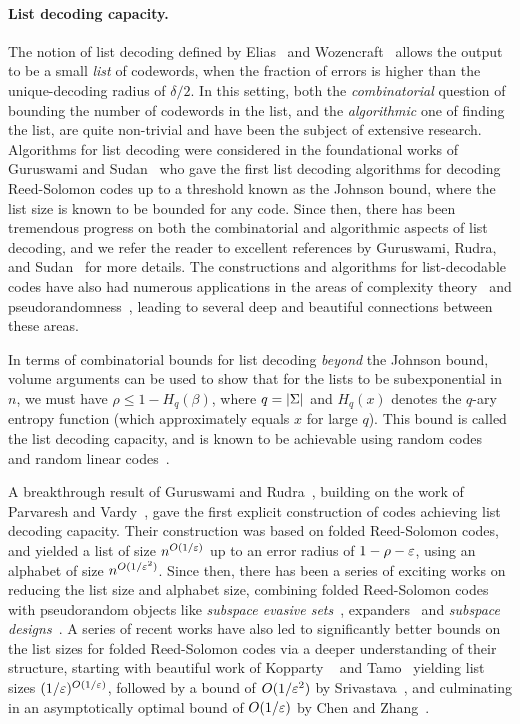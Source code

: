 \vspace{-5 pt}
\paragraph{List decoding capacity.}
%
The notion of list decoding defined by Elias~\cite{E57} and Wozencraft~\cite{W58} allows the output to be a small \emph{list} of codewords, when the fraction of errors is higher than the unique-decoding radius of $\delta/2$.
%
In this setting, both the \emph{combinatorial} question of bounding the number of codewords in the list, and the \emph{algorithmic} one of finding the list, are quite non-trivial and have been the subject of extensive research. Algorithms for list decoding were considered in the foundational works of Guruswami and Sudan~\cite{Sudan97, GS98} who gave the first list decoding algorithms for decoding Reed-Solomon codes up to a threshold known as the Johnson bound, where the list size is known to be bounded for any code.
%
Since then, there has been tremendous progress on both the combinatorial and algorithmic aspects of list decoding, and we refer the reader to excellent references by Guruswami, Rudra, and Sudan~\cite{Guruswami06, GRS23} for more details.
%
The constructions and algorithms for list-decodable codes have also had numerous applications in the areas of complexity theory~\cite{Sudan00, Trevisan05} and pseudorandomness~\cite{GUV09, Vadhan12}, leading to several deep and beautiful connections between these areas.


%
In terms of combinatorial bounds for list decoding \emph{beyond} the Johnson bound, volume arguments can be used to show that for the lists to be subexponential in $n$, we must have $\rho \leq 1 - H_q(\beta)$, where $q = \lvert\Sigma\rvert$ and $H_q(x)$ denotes the $q$-ary entropy function (which approximately equals $x$ for large $q$). This bound is called the list decoding capacity, and is known to be achievable using random codes~\cite{GRS23} and random linear codes~\cite{GHK11}.

A breakthrough result of Guruswami and Rudra~\cite{GR06, GR08}, building on the work of Parvaresh and Vardy~\cite{PV05}, gave the first explicit construction of codes achieving list decoding capacity. 
%
Their construction was based on folded Reed-Solomon codes, and yielded a list of size $n^{O(1/\varepsilon)}$ up to an error radius of $1 - \rho - \varepsilon$, using an alphabet of size $n^{O(1/\varepsilon^2)}$. 
%
Since then, there has been a series of exciting works on reducing the list size and alphabet size, combining folded Reed-Solomon codes with pseudorandom objects like \textit{subspace evasive sets}~\cite{Gur11, DL12,GW13}, expanders~\cite{KRZSW18} and \textit{subspace designs}~\cite{GK16, GRZ21}. 
% 
A series of recent works have also led to significantly better bounds on the list sizes for folded Reed-Solomon codes via a deeper understanding of their structure, starting with beautiful work of Kopparty \etal~\cite{KRZSW18,KRSW23} and Tamo~\cite{Tamo24} yielding list sizes $(1/\varepsilon)^{O(1/\varepsilon)}$, followed by a bound of $O(1/\varepsilon^2)$ by Srivastava~\cite{Sri25}, and culminating in an asymptotically optimal bound of $O(1/\varepsilon)$ by Chen and Zhang~\cite{CZ24}.

